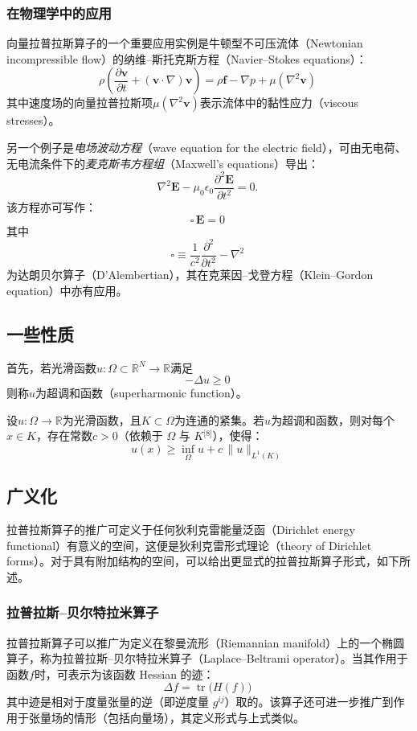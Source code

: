 \subsubsection{在物理学中的应用}
向量拉普拉斯算子的一个重要应用实例是牛顿型不可压流体（Newtonian incompressible flow）的纳维–斯托克斯方程（Navier–Stokes equations）：
\[
\rho \left(
  \frac{\partial \mathbf{v}}{\partial t}
  + (\mathbf{v} \cdot \nabla) \mathbf{v}
\right)
= \rho \mathbf{f}
- \nabla p
+ \mu (\nabla^{2} \mathbf{v})~
\]
其中速度场的向量拉普拉斯项$\mu (\nabla^{2} \mathbf{v})$表示流体中的黏性应力（viscous stresses）。

另一个例子是\emph{电场波动方程}（wave equation for the electric field），可由无电荷、无电流条件下的\emph{麦克斯韦方程组}（Maxwell’s equations）导出：
\[
\nabla^{2} \mathbf{E}
- \mu_{0} \epsilon_{0}
  \frac{\partial^{2} \mathbf{E}}{\partial t^{2}}
= 0.~
\]
该方程亦可写作：
\[
\square \, \mathbf{E} = 0~
\]
其中
\[
\square \equiv \frac{1}{c^{2}} \frac{\partial^{2}}{\partial t^{2}} - \nabla^{2}~
\]
为达朗贝尔算子（D’Alembertian），其在克莱因–戈登方程（Klein–Gordon equation）中亦有应用。
\subsection{一些性质}
首先，若光滑函数$u : \Omega \subset \mathbb{R}^{N} \to \mathbb{R}$满足
\[
- \Delta u \geq 0~
\]
则称$u$为超调和函数（superharmonic function）。

设$u : \Omega \to \mathbb{R}$为光滑函数，且$K \subset \Omega$为连通的紧集。若$u$为超调和函数，则对每个$x \in K$，存在常数$c > 0$（依赖于 $\Omega$ 与 $K$\(^\text{[8]}\)），使得：
\[
u(x) \geq \inf_{\Omega} u + c \, \lVert u \rVert_{L^{1}(K)}~
\]
\subsection{广义化}
拉普拉斯算子的推广可定义于任何狄利克雷能量泛函（Dirichlet energy functional）有意义的空间，这便是狄利克雷形式理论（theory of Dirichlet forms）。对于具有附加结构的空间，可以给出更显式的拉普拉斯算子形式，如下所述。
\subsubsection{拉普拉斯–贝尔特拉米算子}
拉普拉斯算子可以推广为定义在黎曼流形（Riemannian manifold）上的一个椭圆算子，称为拉普拉斯–贝尔特拉米算子（Laplace–Beltrami operator）。当其作用于函数$f$时，可表示为该函数 Hessian 的迹：
\[
\Delta f = \operatorname{tr}\bigl(H(f)\bigr)~
\]
其中迹是相对于度量张量的逆（即逆度量 $g^{ij}$）取的。该算子还可进一步推广到作用于张量场的情形（包括向量场），其定义形式与上式类似。

